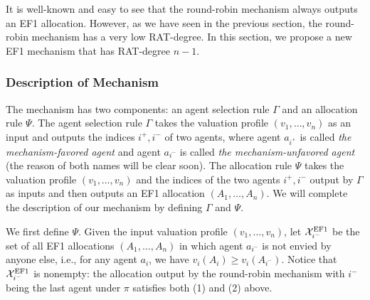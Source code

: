 It is well-known and easy to see that the round-robin mechanism always outputs an EF1 allocation.
However, as we have seen in the previous section, the round-robin mechanism has a very low RAT-degree.
In this section, we propose a new EF1 mechanism that has RAT-degree $n-1$.

\subsubsection{Description of Mechanism}
\label{sect:EF1Mechanism_description}
The mechanism has two components: an agent selection rule $\Gamma$ and an allocation rule $\Psi$.
The agent selection rule $\Gamma$ takes the valuation profile $(v_1,\ldots,v_n)$ as an input and outputs the indices $i^+,i^-$ of two agents, where agent $a_{i^+}$ is called \emph{the mechanism-favored agent} and agent $a_{i^-}$ is called \emph{the mechanism-unfavored agent} (the reason of both names will be clear soon).
The allocation rule $\Psi$ takes the valuation profile $(v_1,\ldots,v_n)$ and the indices of the two agents $i^+,i^-$ output by $\Gamma$ as inputs and then outputs an EF1 allocation $(A_1,\ldots,A_n)$.
We will complete the description of our mechanism by defining $\Gamma$ and $\Psi$.


We first define $\Psi$.
Given the input valuation profile $(v_1,\ldots,v_n)$, let $\mathcal{X}^{\mathrm{EF1}}_{i^-}$ be the set of all EF1 allocations $(A_1,\ldots,A_n)$ in which agent $a_{i^-}$ is not envied by anyone else, i.e., for any agent $a_i$, we have $v_i(A_i)\geq v_i(A_{i^-})$.
Notice that $\mathcal{X}^{\mathrm{EF1}}_{i^-}$ is nonempty: 
the allocation output by the round-robin mechanism with $i^-$ being the last agent under $\pi$ satisfies both (1) and (2) above.

